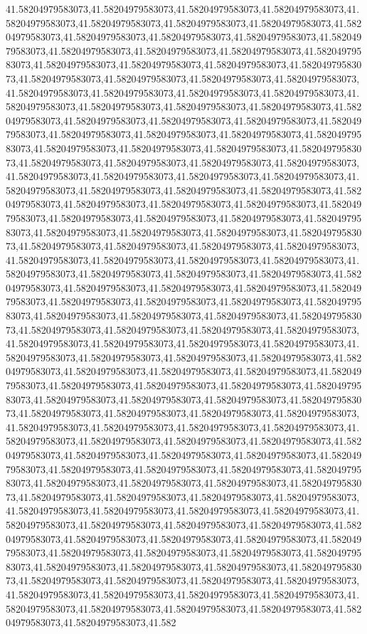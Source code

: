 41.58204979583073,41.58204979583073,41.58204979583073,41.58204979583073,41.58204979583073,41.58204979583073,41.58204979583073,41.58204979583073,41.58204979583073,41.58204979583073,41.58204979583073,41.58204979583073,41.58204979583073,41.58204979583073,41.58204979583073,41.58204979583073,41.58204979583073,41.58204979583073,41.58204979583073,41.58204979583073,41.58204979583073,41.58204979583073,41.58204979583073,41.58204979583073,41.58204979583073,41.58204979583073,41.58204979583073,41.58204979583073,41.58204979583073,41.58204979583073,41.58204979583073,41.58204979583073,41.58204979583073,41.58204979583073,41.58204979583073,41.58204979583073,41.58204979583073,41.58204979583073,41.58204979583073,41.58204979583073,41.58204979583073,41.58204979583073,41.58204979583073,41.58204979583073,41.58204979583073,41.58204979583073,41.58204979583073,41.58204979583073,41.58204979583073,41.58204979583073,41.58204979583073,41.58204979583073,41.58204979583073,41.58204979583073,41.58204979583073,41.58204979583073,41.58204979583073,41.58204979583073,41.58204979583073,41.58204979583073,41.58204979583073,41.58204979583073,41.58204979583073,41.58204979583073,41.58204979583073,41.58204979583073,41.58204979583073,41.58204979583073,41.58204979583073,41.58204979583073,41.58204979583073,41.58204979583073,41.58204979583073,41.58204979583073,41.58204979583073,41.58204979583073,41.58204979583073,41.58204979583073,41.58204979583073,41.58204979583073,41.58204979583073,41.58204979583073,41.58204979583073,41.58204979583073,41.58204979583073,41.58204979583073,41.58204979583073,41.58204979583073,41.58204979583073,41.58204979583073,41.58204979583073,41.58204979583073,41.58204979583073,41.58204979583073,41.58204979583073,41.58204979583073,41.58204979583073,41.58204979583073,41.58204979583073,41.58204979583073,41.58204979583073,41.58204979583073,41.58204979583073,41.58204979583073,41.58204979583073,41.58204979583073,41.58204979583073,41.58204979583073,41.58204979583073,41.58204979583073,41.58204979583073,41.58204979583073,41.58204979583073,41.58204979583073,41.58204979583073,41.58204979583073,41.58204979583073,41.58204979583073,41.58204979583073,41.58204979583073,41.58204979583073,41.58204979583073,41.58204979583073,41.58204979583073,41.58204979583073,41.58204979583073,41.58204979583073,41.58204979583073,41.58204979583073,41.58204979583073,41.58204979583073,41.58204979583073,41.58204979583073,41.58204979583073,41.58204979583073,41.58204979583073,41.58204979583073,41.58204979583073,41.58204979583073,41.58204979583073,41.58204979583073,41.58204979583073,41.58204979583073,41.58204979583073,41.58204979583073,41.58204979583073,41.58204979583073,41.58204979583073,41.58204979583073,41.58204979583073,41.58204979583073,41.58204979583073,41.58204979583073,41.58204979583073,41.58204979583073,41.58204979583073,41.58204979583073,41.58204979583073,41.58204979583073,41.58204979583073,41.58204979583073,41.58204979583073,41.58204979583073,41.58204979583073,41.58204979583073,41.58204979583073,41.58204979583073,41.58204979583073,41.58204979583073,41.58204979583073,41.58204979583073,41.58204979583073,41.58204979583073,41.58204979583073,41.58204979583073,41.58204979583073,41.58204979583073,41.58204979583073,41.58204979583073,41.58204979583073,41.58204979583073,41.58204979583073,41.58204979583073,41.58204979583073,41.58204979583073,41.582